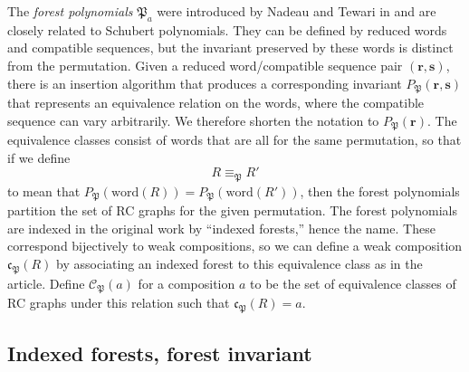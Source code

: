 \documentclass{amsart}
\theoremstyle{definition}
\theoremstyle{remark}
\numberwithin{equation}{subsection}
\newcommand{\forest}{\mathfrak{P}}
\newcommand{\fcode}{\mathfrak{c}_\forest}
\newcommand{\finv}{P_{\forest}}
\begin{document}
The \emph{forest polynomials} $\forest_a$ were introduced by Nadeau and Tewari in \cite{nadeau2024forest} and are closely related to Schubert polynomials. They can be defined by reduced words and compatible sequences, but the invariant preserved by these words is distinct from the permutation. Given a reduced word/compatible sequence pair $(\mathbf{r},\mathbf{s})$, there is an insertion algorithm that produces a corresponding invariant $\finv(\mathbf{r},\mathbf{s})$ that represents an equivalence relation on the words, where the compatible sequence can vary arbitrarily. We therefore shorten the notation to $\finv(\mathbf{r})$. The equivalence classes consist of words that are all for the same permutation, so that if we define
$$R\equiv_{\forest} R'$$
to mean that $\finv(\mathrm{word}(R)) = \finv(\mathrm{word}(R'))$, then the forest polynomials partition the set of RC graphs for the given permutation. The forest polynomials are indexed in the original work by ``indexed forests,'' hence the name. These correspond bijectively to weak compositions, so we can define a weak composition $\fcode(R)$ by associating an indexed forest to this equivalence class as in the article. Define $\mathcal{C}_\forest(a)$ for a composition $a$ to be the set of equivalence classes of RC graphs under this relation such that $\fcode(R)=a$.


\subsection{Indexed forests, forest invariant}
\end{document}
